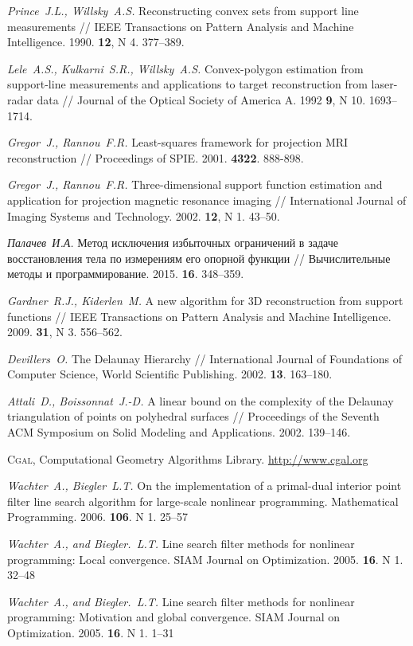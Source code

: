 \documentclass[a4paper, 10pt]{article}
\theoremstyle{definition}
\theoremstyle{plain}
\theoremstyle{plain}
\begin{document}
\begin{thebibliography}{50}

\emph{Prince~J.L., Willsky~A.S.}
Reconstructing convex sets from support line measurements //
IEEE Transactions on Pattern Analysis and Machine Intelligence.
1990.
\textbf{12},
N 4.
377--389.

\emph{Lele~A.S., Kulkarni~S.R., Willsky~A.S.}
Convex-polygon estimation from support-line measurements and applications to
target reconstruction from laser-radar data //
Journal of the Optical Society of America A.
1992
\textbf{9},
N 10.
1693--1714.

\emph{Gregor~J., Rannou~F.R.}
Least-squares framework for projection {MRI} reconstruction //
Proceedings of SPIE.
2001.
\textbf{4322}.
888-898.

\emph{Gregor~J., Rannou~F.R.}
Three-dimensional support function estimation and application for projection
magnetic resonance imaging //
International Journal of Imaging Systems and Technology.
2002.
\textbf{12},
N 1.
43--50.

\emph{Палачев~И.А.}
Метод исключения избыточных ограничений в задаче восстановления тела по
измерениям его опорной функции //
Вычислительные методы и программирование.
2015.
\textbf{16}.
348--359.

\emph{Gardner~R.J., Kiderlen~M.}
A new algorithm for 3D reconstruction from support functions //
IEEE Transactions on Pattern Analysis and Machine Intelligence.
2009.
\textbf{31},
N 3.
556--562.

\emph{Devillers~O.}
The Delaunay Hierarchy //
International Journal of Foundations of Computer Science,
World Scientific Publishing.
2002.
\textbf{13}.
163--180.

\emph{Attali~D., Boissonnat~J.-D.}
A linear bound on the complexity of the Delaunay triangulation of points on
polyhedral surfaces //
Proceedings of the Seventh ACM Symposium on Solid Modeling and Applications.
2002.
139--146.

\textsc{Cgal}, {C}omputational {G}eometry {A}lgorithms {L}ibrary.
\url{http://www.cgal.org}

\emph{Wachter~A., Biegler~L.T.}
On the implementation of a primal-dual interior point filter line search
algorithm for large-scale nonlinear programming.
Mathematical Programming.
2006.
\textbf{106}.
N 1.
25--57

\emph{Wachter~A., and Biegler.~L.T.}
Line search filter methods for nonlinear programming: Local convergence.
SIAM Journal on Optimization.
2005.
\textbf{16}.
N 1.
32--48

\emph{Wachter~A., and Biegler.~L.T.}
Line search filter methods for nonlinear programming: Motivation and global
convergence.
SIAM Journal on Optimization.
2005.
\textbf{16}.
N 1.
1--31
\end{thebibliography}
\end{document}
